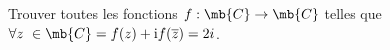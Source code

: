 \exercice

Trouver toutes les fonctions $f : \mb{C} \rightarrow \mb{C}$ telles que $\forall z~\in \mb{C} = f(z) + \text{i} f(\overline{z}) = 2i$.

